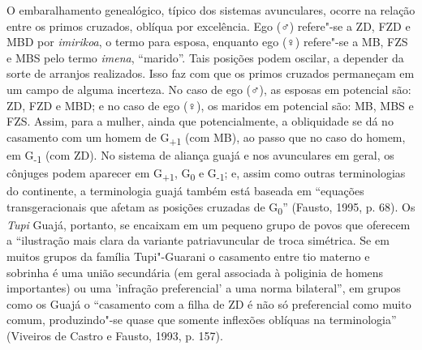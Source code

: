 O embaralhamento genealógico, típico dos sistemas avunculares, ocorre na
relação entre os primos cruzados, oblíqua por excelência. Ego (♂)
refere"-se a ZD, FZD e MBD por \emph{imirikoa}, o termo para esposa,
enquanto ego (♀) refere"-se a MB, FZS e MBS pelo termo \emph{imena},
``marido''. Tais posições podem oscilar, a depender da sorte de arranjos
realizados. Isso faz com que os primos cruzados permaneçam em um campo
de alguma incerteza. No caso de ego (♂), as esposas em potencial são:
ZD, FZD e MBD; e no caso de ego (♀), os maridos em potencial são: MB,
MBS e FZS. Assim, para a mulher, ainda que potencialmente, a obliquidade
se dá no casamento com um homem de G\textsubscript{+1} (com MB), ao
passo que no caso do homem, em G\textsubscript{-1} (com ZD). No sistema
de aliança guajá e nos avunculares em geral, os cônjuges podem aparecer
em G\textsubscript{+1}, G\textsubscript{0} e G\textsubscript{-1}; e,
assim como outras terminologias do continente, a terminologia guajá
também está baseada em ``equações transgeracionais que afetam as
posições cruzadas de G\textsubscript{0}'' (Fausto, 1995, p. 68). Os
\emph{Tupi} Guajá, portanto, se encaixam em um pequeno grupo de povos
que oferecem a ``ilustração mais clara da variante patriavuncular de
troca simétrica. Se em muitos grupos da família Tupi"-Guarani o casamento
entre tio materno e sobrinha é uma união secundária (em geral associada
à poliginia de homens importantes) ou uma 'infração preferencial' a uma
norma bilateral'', em grupos como os Guajá o ``casamento com a filha de ZD
é não só preferencial como muito comum, produzindo"-se quase que somente
inflexões oblíquas na terminologia'' (Viveiros de Castro e Fausto, 1993,
p. 157).


